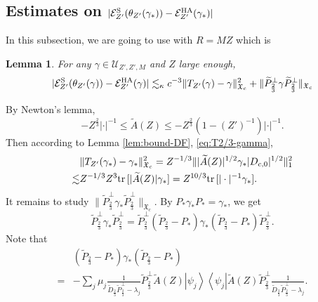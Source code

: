 \documentclass[a4paper]{amsart}
\newtheorem{lemma}{Lemma}
\def\tr{{\rm tr \,}}
\def\cE{{\mathcal E}}
\def\gX{\mathfrak{X}}
\begin{document}
\subsection{Estimates on $|\cE_{Z'}^{\rm S}(\theta_{Z'}(\gamma_*))-\cE_{Z'}^{\rm HA}(\gamma_*)|$}
In this subsection, we are going to use \cite[Lemma 5.1]{Meng2023}
with $R=MZ$ which is
\begin{lemma}\label{lem:error-bound}
For any $\gamma\in\mathcal{U}_{Z',Z',M}$ and $Z$ large enough, 
\begin{equation}
    |\cE_{Z'}^{\rm S}(\theta_{Z'}(\gamma))-\mathcal{E}_{Z'}^{\rm HA}(\gamma)|\lesssim_\kappa c^{-3}\|T_{Z'}(\gamma)-\gamma\|_{\gX_c}^2+\|\widetilde{P}_{\frac23}^\perp\gamma \widetilde{P}_{\frac23}^\perp\|_{\gX_c}
\end{equation}
 \end{lemma}
By Newton's lemma,
\begin{equation}
   - Z^{\frac23}|\cdot|^{-1} \leq \widetilde{A}(Z)\leq -Z^{\frac23} (1- (Z')^{-1})|\cdot|^{-1}.
\end{equation}
Then according to Lemma \ref{lem:bound-DF}, \eqref{eq:T2/3-gamma},
\begin{equation}
  \begin{split}
    &\|T_{Z'}(\gamma_*)-\gamma_*\|_{\gX_c}^2 =Z^{-1/3}\||\widetilde{A}(Z)|^{1/2}\gamma_* |D_{c,0}|^{1/2}\|_1^2\\
    \lesssim& Z^{-1/3}Z^{3}\tr[|\widetilde{A}(Z)|\gamma_*]=Z^{10/3}\tr[|\cdot|^{-1}\gamma_*].
  \end{split}
\end{equation}
It remains to study $\|\widetilde{P}_{\frac23}^\perp\gamma_* \widetilde{P}_{\frac23}^\perp\|_{\gX_c}$. By $P_*\gamma_*P_*=\gamma_*$, we get
\begin{equation}
    \widetilde{P}_{\frac23}^\perp\gamma_* \widetilde{P}_{\frac23}^\perp= \widetilde{P}_{\frac23}^\perp(\widetilde{P}_{\frac23}-P_*)\gamma_* (\widetilde{P}_{\frac23}-P_*) \widetilde{P}_{\frac23}^\perp.
\end{equation}
Note that
\begin{equation}
  \begin{split}
 & (\widetilde{P}_{\frac23}-P_*)\gamma_* (\widetilde{P}_{\frac23}-P_*)\\
  =& - \sum_{j}\mu_j \frac{1}{\widetilde{D}_{\frac23} \widetilde{P}_{\frac23}^\perp -\lambda_j} \widetilde{P}_{\frac23}^\perp \widetilde{A}(Z)\left|\psi_j\right>\left<\psi_j\right|\widetilde{A}(Z) \widetilde{P}_{\frac23}^\perp\frac{1}{\widetilde{D}_{\frac23} \widetilde{P}_{\frac23}^\perp -\lambda_j}.
  \end{split}
\end{equation}
\end{document}
